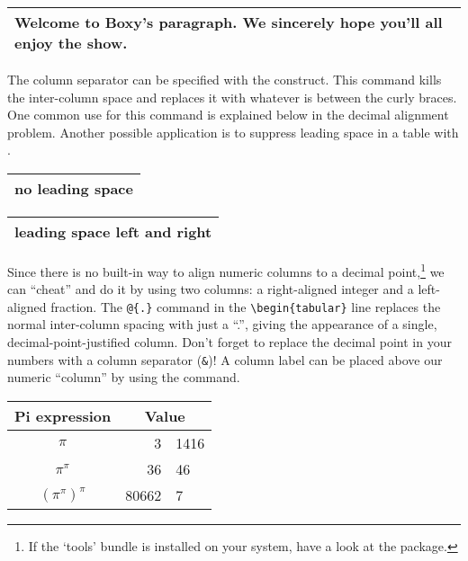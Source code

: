 \begin{example}
\begin{tabular}{|p{4.7cm}|}
\hline
Welcome to Boxy's paragraph.
We sincerely hope you'll
all enjoy the show.\\
\hline
\end{tabular}
\end{example}

The column separator can be specified with the 
construct. This command kills the inter-column space and replaces it
with whatever is between the curly braces.  One common use for
this command is explained below in the decimal alignment problem.
Another possible application is to suppress leading space in a table with
.

\begin{example}
\begin{tabular}{@{} l @{}}
\hline
no leading space\\
\hline
\end{tabular}
\end{example}

\begin{example}
\begin{tabular}{l}
\hline
leading space left and right\\
\hline
\end{tabular}
\end{example}

%
%

 Since there is no built-in way to align
numeric columns to a decimal point,\footnote{If the `tools' bundle is
  installed on your system, have a look at the  package.}
we can ``cheat'' and do it by using two columns: a right-aligned
integer and a left-aligned fraction. The \verb|@{.}| command in the
\verb|\begin{tabular}| line replaces the normal inter-column spacing with
just a ``.'', giving the appearance of a single,
decimal-point-justified column.  Don't forget to replace the decimal
point in your numbers with a column separator (\verb|&|)! A column label
can be placed above our numeric ``column'' by using the
 command.

\begin{example}
\begin{tabular}{c r @{.} l}
Pi expression       &
\multicolumn{2}{c}{Value} \\
\hline
$\pi$               & 3&1416  \\
$\pi^{\pi}$         & 36&46   \\
$(\pi^{\pi})^{\pi}$ & 80662&7 \\
\end{tabular}
\end{example}

